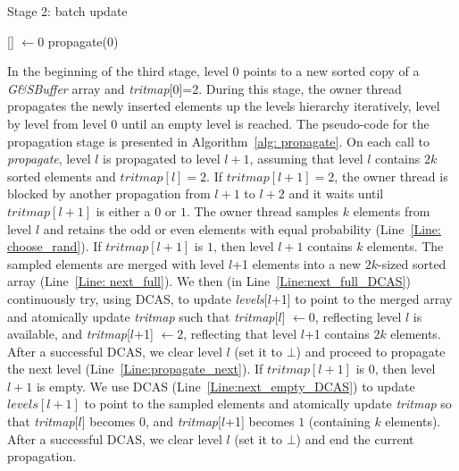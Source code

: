 \begin{algorithm}
\caption{Stage 2: batch update} \label{alg: batch_update}
\begin{algorithmic}[1]
\setcounter{ALG@line}{\value{mycounter}}
     \label{Line:insert_batch}
        \State {}[] $\gets 0$
        \State propagate(0)
    \EndWhile
\EndProcedure
\setcounter{mycounter}{\value{ALG@line}}
\end{algorithmic}
\end{algorithm}


In the beginning of the third stage, level 0 points to a new sorted copy of a \emph{G\&SBuffer} array and \emph{tritmap}[0]=2. During this stage, the owner thread propagates the newly inserted elements up the levels hierarchy iteratively, level by level from level 0 until an empty level is reached. The pseudo-code for the propagation stage is presented in Algorithm~\ref{alg: propagate}. On each call to \emph{propagate}, level $l$ is propagated to level $l+1$, assuming that level $l$ contains $2k$ sorted elements and $\mathit{tritmap}[l]=2$. If $\mathit{tritmap}[l+1]=2$, the owner thread is blocked by another propagation from $l+1$ to $l+2$ and it waits until $\mathit{tritmap}[l+1]$ is either a $0$ or $1$. The owner thread samples $k$ elements from level $l$ and retains the odd or even elements with equal probability (Line~\ref{Line: choose_rand}). 
If $\mathit{tritmap}[l+1]$ is $1$, then level $l+1$ contains $k$ elements. The sampled elements are merged with level $l$+1 elements into a new $2k$-sized sorted array (Line~\ref{Line: next_full}). We then (in Line~\ref{Line:next_full_DCAS}) continuously try, using DCAS, to update \emph{levels}[$l$+1] to point to the merged array and atomically update \emph{tritmap} such that \emph{tritmap}[$l$] $\gets 0$, reflecting level $l$ is available, and \emph{tritmap}[$l$+1] $\gets 2$, reflecting that level $l$+1 contains $2k$ elements. After a successful DCAS, we clear level $l$ (set it to $\bot$) and proceed to propagate the next level (Line~\ref{Line:propagate_next}). 
If $\mathit{tritmap}[l+1]$ is $0$, then level $l+1$ is empty. We use DCAS (Line~\ref{Line:next_empty_DCAS}) to update $\mathit{levels}[l+1]$ to point to the sampled elements and atomically update \emph{tritmap} so that \emph{tritmap}[$l$] becomes $0$, and \emph{tritmap}[$l$+1] becomes $1$ (containing $k$ elements). After a successful DCAS, we clear level $l$ (set it to $\bot$) and end the current propagation.

